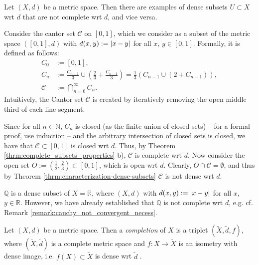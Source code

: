 \begin{remark}
	Let $(X, d)$ be a metric space. Then there are examples of dense subsets $U\subset X$ wrt $d$ that are not complete wrt $d$, and vice versa.
\end{remark}

\begin{exmp}
	Consider the cantor set $\mathcal C$ on $[0, 1]$, which we consider as a subset of the metric space $\left([0, 1], d\right)$ with $d(x, y) := \left\vert x - y \right\vert$ for all $x$, $y\in[0, 1]$. Formally, it is defined as follows:
	\begin{align}
		C_{0} &:= [0, 1],
		\\ C_{n} &:= \frac{C_{n-1}}{3} \cup \left(\frac{2}{3} + \frac{C_{n-1}}{3}\right) = \frac{1}{3}\left(C_{n-1} \cup \left( 2 + C_{n-1} \right)\right),
		\\ \mathcal C &:= \bigcap_{n=0}^{\infty}C_n.
	\end{align} 
	Intuitively, the Cantor set $\mathcal C$ is created by iteratively removing the open middle third of each line segment.
	
	Since for all $n\in\mathbb N$, $C_n$ is closed (as the finite union of closed sets) -- for a formal proof, use induction -- and the arbitrary intersection of closed sets is closed, we have that $\mathcal C\subset [0, 1]$ is closed wrt $d$. Thus, by Theorem \ref{thrm:complete_subsets_properties} b), $\mathcal C$ is complete wrt $d$. Now consider the open set $O := \left(\frac{1}{2}, \frac{2}{3}\right) \subset [0, 1]$, which is open wrt $d$. Clearly, $O\cap \mathcal C = \emptyset$, and thus by Theorem \ref{thrm:characterization-dense-subsets} $\mathcal C$ is not dense wrt $d$.
\end{exmp}

\begin{exmp}
	$\mathbb Q$ is a dense subset of $X = \mathbb R$, where $\left(X, d\right)$ with $d(x, y) := \left\vert x-y \right\vert$ for all $x$, $y\in\mathbb R$. However, we have already established that $\mathbb Q$ is not complete wrt $d$, e.g. cf. Remark \ref{remark:cauchy_not_convergent_necess}.
\end{exmp}

\begin{defn}
	Let $(X, d)$ be a metric space. Then a \textit{completion} of $X$ is a triplet $\left(\tilde{X}, \tilde{d}, f\right)$, where $\left(\tilde{X}, \tilde{d}\right)$ is a complete metric space and $f: X\to\tilde{X}$ is an isometry with dense image, i.e. $f(X)\subset \tilde{X}$ is dense wrt $\tilde{d}$ \cite[Def. 2.2]{src:completion_metric_spaces}.
\end{defn}


